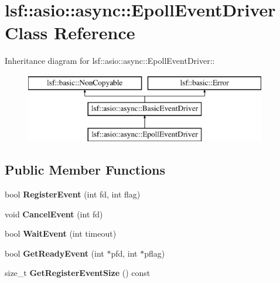 \hypertarget{classlsf_1_1asio_1_1async_1_1EpollEventDriver}{
\section{lsf::asio::async::EpollEventDriver Class Reference}
\label{classlsf_1_1asio_1_1async_1_1EpollEventDriver}
}
Inheritance diagram for lsf::asio::async::EpollEventDriver::\begin{figure}[H]
\begin{center}
\leavevmode
\includegraphics[height=3cm]{classlsf_1_1asio_1_1async_1_1EpollEventDriver}
\end{center}
\end{figure}
\subsection*{Public Member Functions}
\begin{DoxyCompactItemize}
\item 
\hypertarget{classlsf_1_1asio_1_1async_1_1EpollEventDriver_a1e6199907ea9674389cc1ab5bc129dea}{
bool {\bfseries RegisterEvent} (int fd, int flag)}
\label{classlsf_1_1asio_1_1async_1_1EpollEventDriver_a1e6199907ea9674389cc1ab5bc129dea}

\item 
\hypertarget{classlsf_1_1asio_1_1async_1_1EpollEventDriver_a2454c047d0951da83f8558fb400093c6}{
void {\bfseries CancelEvent} (int fd)}
\label{classlsf_1_1asio_1_1async_1_1EpollEventDriver_a2454c047d0951da83f8558fb400093c6}

\item 
\hypertarget{classlsf_1_1asio_1_1async_1_1EpollEventDriver_a99aa3bcb2b6f712d4647fc03101e3a58}{
bool {\bfseries WaitEvent} (int timeout)}
\label{classlsf_1_1asio_1_1async_1_1EpollEventDriver_a99aa3bcb2b6f712d4647fc03101e3a58}

\item 
\hypertarget{classlsf_1_1asio_1_1async_1_1EpollEventDriver_a70ad025ee24758c476f759417dd5348c}{
bool {\bfseries GetReadyEvent} (int $\ast$pfd, int $\ast$pflag)}
\label{classlsf_1_1asio_1_1async_1_1EpollEventDriver_a70ad025ee24758c476f759417dd5348c}

\item 
\hypertarget{classlsf_1_1asio_1_1async_1_1EpollEventDriver_a2685b6f42f089f2c70199411162599ce}{
size\_\-t {\bfseries GetRegisterEventSize} () const }
\label{classlsf_1_1asio_1_1async_1_1EpollEventDriver_a2685b6f42f089f2c70199411162599ce}

\end{DoxyCompactItemize}
